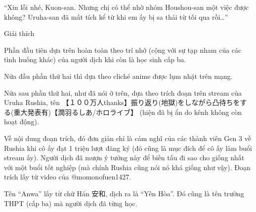 \documentclass[../main.tex]{subfiles}
\begin{document}
``Xin lỗi nhé, Kuon-san. Nhưng chị có thể nhờ nhóm Houshou-san một việc được không? Uruha-san đã mất tích kể từ khi em ấy bị sa thải từ tối qua rồi\dots''

\begin{center}
  {\abv Giải thích}
\end{center}

Phần đầu tiên dựa trên hoàn toàn theo trí nhớ (cộng với sự tạp nham của các tình huống khác) của người dịch khi còn là học sinh cấp ba.

Nửa đầu phần thứ hai thì dựa theo cliché anime được lụm nhặt trên mạng.

Nửa sau phần thứ hai, như đã nói ở trên, dựa theo trích đoạn trên stream của Uruha Rushia, tên 【１００万人thanks】振り返り(地獄)をしながら凸待ちをする(重大発表有)【潤羽るしあ/ホロライブ】 (hiện đã bị ẩn do kênh không còn hoạt động).

Về nội dung đoạn trích, đó đơn giản chỉ là cảm nghĩ của các thành viên Gen 3 về Rushia khi cô ấy đạt 1 triệu lượt đăng ký (đó cũng là mục đích để cô ấy làm buổi stream ấy). Người dịch đã mượn ý tưởng này để biến tấu đi sao cho giống nhất với một buổi tốt nghiệp (mà chính Rushia cũng nói nó khá giống như vậy). Đoạn trích lấy từ video của @momonofuen1427.

Tên ``Anwa'' lấy từ chữ Hán 安和, dịch ra là ``Yên Hòa''. Đó cũng là tên trường THPT (cấp ba) mà người dịch đã từng học.
\end{document}
